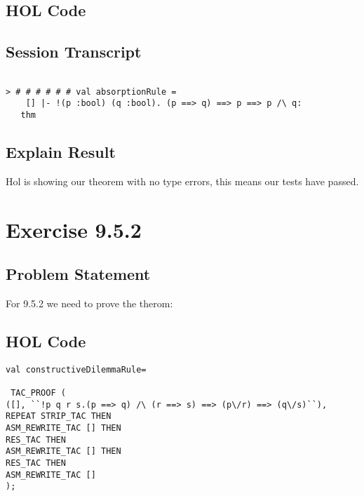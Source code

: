 \documentclass{report}
\begin{document}
\section{HOL Code}
\label{HOl Code 841}


\section{Session Transcript}
\label{Session Trans1}

\setcounter{sessioncount}{0}
\begin{session}
  \begin{scriptsize}
\begin{verbatim}

> # # # # # # val absorptionRule =
    [] |- !(p :bool) (q :bool). (p ==> q) ==> p ==> p /\ q:
   thm
\end{verbatim}
  \end{scriptsize}
\end{session}

\section{Explain Result}
\label{eplain re 951}
Hol is showing our theorem with no type errors, this means our tests have passed.


\chapter{Exercise 9.5.2}
\label{ex 952}

\section{Problem Statement}
\label{problem state 952}
For 9.5.2 we need to prove the therom:


\section{HOL Code}
\label{HOl Code 952}

\begin{lstlisting}[frame=trBL]
val constructiveDilemmaRule=

 TAC_PROOF (
([], ``!p q r s.(p ==> q) /\ (r ==> s) ==> (p\/r) ==> (q\/s)``),
REPEAT STRIP_TAC THEN
ASM_REWRITE_TAC [] THEN
RES_TAC THEN
ASM_REWRITE_TAC [] THEN
RES_TAC THEN
ASM_REWRITE_TAC []
);

\end{lstlisting}
\end{document}
